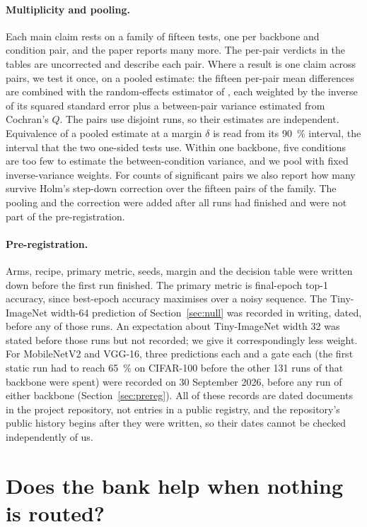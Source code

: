 \documentclass[10pt,a4paper]{article}
\begin{document}
\paragraph{Multiplicity and pooling.} Each main claim rests on a family
of fifteen tests, one per backbone and condition pair, and the paper
reports many more. The per-pair verdicts in the tables are uncorrected and
describe each pair. Where a result is one claim across pairs, we test it
once, on a pooled estimate: the fifteen per-pair mean differences are
combined with the random-effects estimator of
\citet{dersimonian1986}, each weighted by the inverse of its squared
standard error plus a between-pair variance estimated from Cochran's $Q$.
The pairs use disjoint runs, so their estimates are independent.
Equivalence of a pooled estimate at a margin $\delta$ is read from its
\SI{90}{\percent} interval, the interval that the two one-sided tests use.
Within one backbone, five conditions are too few to estimate the
between-condition variance, and we pool with fixed inverse-variance
weights. For counts of significant pairs we also report how many survive
Holm's step-down correction \citep{holm1979} over the fifteen pairs of the
family. The pooling and the correction were added after all runs had
finished and were not part of the pre-registration.

\paragraph{Pre-registration.} Arms, recipe, primary metric, seeds, margin
and the decision table were written down before the first run finished.
The primary metric is final-epoch top-1 accuracy, since best-epoch
accuracy maximises over a noisy sequence. The Tiny-ImageNet width-64
prediction of Section~\ref{sec:null} was recorded in writing, dated,
before any of those runs. An expectation about Tiny-ImageNet width 32 was
stated before those runs but not recorded; we give it correspondingly
less weight. For MobileNetV2 and VGG-16, three predictions each and a gate
each (the first static run had to reach \SI{65}{\percent} on CIFAR-100
before the other 131 runs of that backbone were spent) were recorded on 30
September 2026, before any run of either backbone
(Section~\ref{sec:prereg}). All of these records are dated documents in
the project repository, not entries in a public registry, and the
repository's public history begins after they were written, so their dates
cannot be checked independently of us.

\section{Does the bank help when nothing is routed?}\label{sec:bank}
\end{document}
